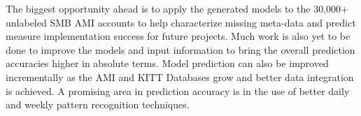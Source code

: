 The biggest opportunity ahead is to apply the generated models to the 30,000+ unlabeled SMB AMI accounts to help characterize missing meta-data and predict measure implementation success for future projects. Much work is also yet to be done to improve the models and input information to bring the overall prediction accuracies higher in absolute terms. Model prediction can also be improved incrementally as the AMI and KITT Databases grow and better data integration is achieved. A promising area in prediction accuracy is in the use of better daily and weekly pattern recognition techniques.
